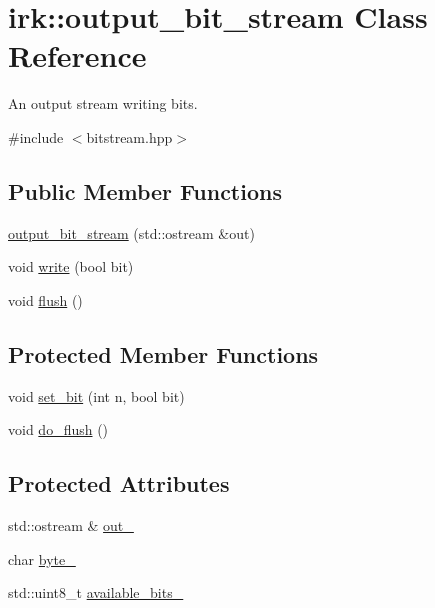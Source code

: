 \hypertarget{classirk_1_1output__bit__stream}{}\section{irk\+:\+:output\+\_\+bit\+\_\+stream Class Reference}
\label{classirk_1_1output__bit__stream}


An output stream writing bits.  




{\ttfamily \#include $<$bitstream.\+hpp$>$}

\subsection*{Public Member Functions}
\begin{DoxyCompactItemize}
\item 
\mbox{\hyperlink{classirk_1_1output__bit__stream_a4977860663181c0c6e0850739d730ada}{output\+\_\+bit\+\_\+stream}} (std\+::ostream \&out)
\item 
void \mbox{\hyperlink{classirk_1_1output__bit__stream_a23f0ccc327c453a5fc24dba747cd4ea4}{write}} (bool bit)
\item 
void \mbox{\hyperlink{classirk_1_1output__bit__stream_a9ab44726c22d696cf681714404e280a7}{flush}} ()
\end{DoxyCompactItemize}
\subsection*{Protected Member Functions}
\begin{DoxyCompactItemize}
\item 
void \mbox{\hyperlink{classirk_1_1output__bit__stream_a918d5479ad1ff09e881a90408da50307}{set\+\_\+bit}} (int n, bool bit)
\item 
void \mbox{\hyperlink{classirk_1_1output__bit__stream_a9fb465b2bb42cd5621139ee629900f27}{do\+\_\+flush}} ()
\end{DoxyCompactItemize}
\subsection*{Protected Attributes}
\begin{DoxyCompactItemize}
\item 
std\+::ostream \& \mbox{\hyperlink{classirk_1_1output__bit__stream_ac8e6feb2595f3e6517d90abbe60c587e}{out\+\_\+}}
\item 
char \mbox{\hyperlink{classirk_1_1output__bit__stream_a7ed815d7ac6b8248374cee46ab28cd5b}{byte\+\_\+}}
\item 
std\+::uint8\+\_\+t \mbox{\hyperlink{classirk_1_1output__bit__stream_ab89e5dcaca9a946970ae9e743c0d132e}{available\+\_\+bits\+\_\+}}
\end{DoxyCompactItemize}


